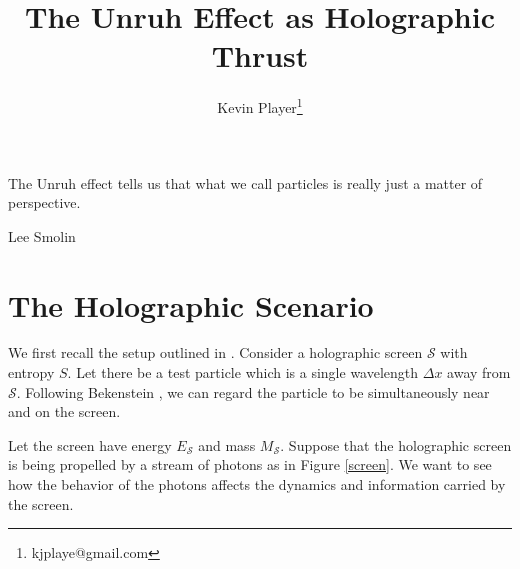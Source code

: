 \documentclass[12pt,a4paper]{article}
\begin{document}
\title{The Unruh Effect as Holographic Thrust}
\author[1]{Kevin Player\footnote{kjplaye@gmail.com}}

\maketitle

\epigraph{The Unruh effect tells us that what we call particles is really just a matter of perspective.}{Lee Smolin}



\section{The Holographic Scenario}
We first recall the setup outlined in \cite{entropic}. Consider a holographic screen $\mathscr{S}$ with entropy $S$.  Let there be a test particle which is a single wavelength $\Delta x$ away from $\mathscr{S}$.  Following Bekenstein \cite{bekenstein}, we can regard the particle to be simultaneously near and on the screen.

Let the screen have energy $E_\mathscr{S}$ and mass $M_\mathscr{S}$.  Suppose that the holographic screen is being propelled by a stream of photons as in Figure \ref{screen}.  We want to see how the behavior of the photons affects the dynamics and information carried by the screen.
\end{document}
